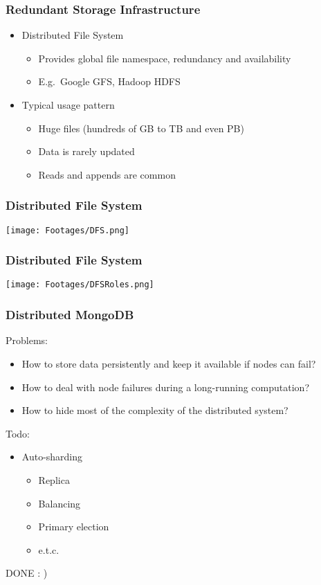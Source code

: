 \documentclass{beamer}
\begin{document}
\begin{frame} \small
\frametitle{Redundant Storage Infrastructure}
\begin{itemize}
  \item Distributed File System
  \begin{itemize}
    \item Provides global file namespace, redundancy and availability
    \item E.g.\ Google GFS, Hadoop HDFS
  \end{itemize}
  \item Typical usage pattern
  \begin{itemize}
    \item Huge files (hundreds of GB to TB and even PB)
    \item Data is rarely updated
    \item Reads and appends are common
  \end{itemize}
\end{itemize}
\end{frame}
\begin{frame} \small
\frametitle{Distributed File System}
\texttt{[image: Footages/DFS.png]}
\end{frame}
\begin{frame} \small
\frametitle{Distributed File System}
\texttt{[image: Footages/DFSRoles.png]}
\end{frame}
\begin{frame} \small
\frametitle{Distributed MongoDB}
Problems:
\begin{itemize}
\item How to store data persistently and keep it available if nodes can fail?
\item How to deal with node failures during a long-running computation?\\
\item How to hide most of the complexity of the distributed system?\\
\end{itemize}
Todo:
\begin{itemize}
\item Auto-sharding
  \begin{itemize}
    \item Replica
    \item Balancing
    \item Primary election
    \item e.t.c.
  \end{itemize}
\end{itemize}
DONE : )
\end{frame}
\end{document}
